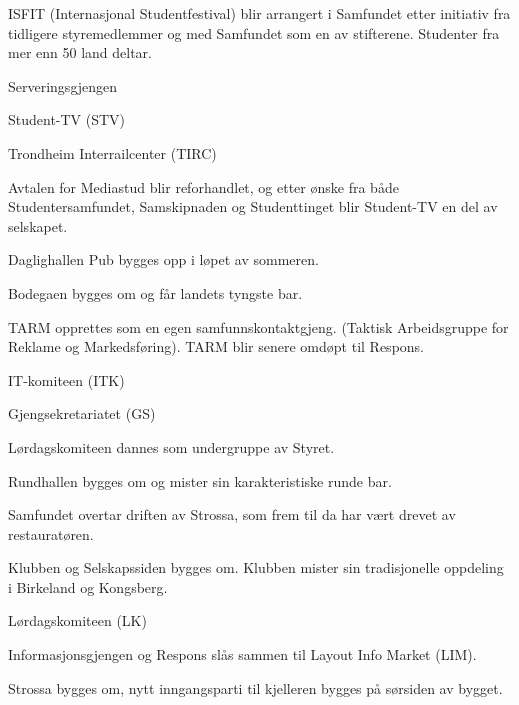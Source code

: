 \documentclass[fsbok.tex]{subfiles}
\begin{document}
  \item ISFIT (Internasjonal Studentfestival) blir arrangert i Samfundet etter initiativ fra tidligere styremedlemmer og
med Samfundet som en av stifterene. Studenter fra mer enn 50 land deltar.
\yearend 

  \item Serveringsgjengen
  \item Student-TV (STV)
\yearend 

  \item Trondheim Interrailcenter (TIRC) 
\yearend 

  \item Avtalen for Mediastud blir reforhandlet, og etter ønske fra både Studentersamfundet, Samskipnaden og
Studenttinget blir Student-TV en del av selskapet.
\yearend 

  \item Daglighallen Pub bygges opp i løpet av sommeren.
  \item Bodegaen bygges om og får landets tyngste bar.
\yearend 

  \item  TARM opprettes som en egen samfunnskontaktgjeng. (Taktisk Arbeidsgruppe for Reklame og Markedsføring). TARM blir senere omdøpt til Respons.
\yearend 

  \item IT-komiteen (ITK)
  \item Gjengsekretariatet (GS)
  \item Lørdagskomiteen dannes som undergruppe av Styret.
  \item Rundhallen bygges om og mister sin karakteristiske runde bar.
\yearend 

  \item Samfundet overtar driften av Strossa, som frem til da har vært drevet av restauratøren. 
\yearend 

  \item Klubben og Selskapssiden bygges om. Klubben mister sin tradisjonelle oppdeling i Birkeland og Kongsberg.
\yearend 

  \item Lørdagskomiteen (LK)
\yearend 

  \item Informasjonsgjengen og Respons slås sammen til Layout Info Market (LIM).
  \item Strossa bygges om, nytt inngangsparti til kjelleren bygges på sørsiden av bygget.
\yearend 
\end{document}
